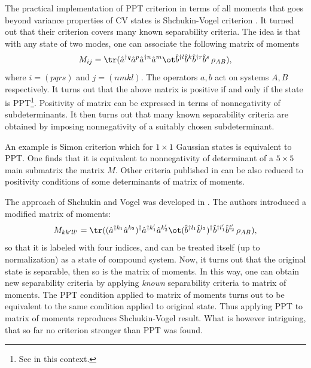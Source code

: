 \documentclass[twocolumn,aps,rmp]{revtex4}
\begin{document}
The practical implementation of PPT criterion in terms of all moments
that goes beyond variance properties of CV states is Shchukin-Vogel
criterion \cite{SV,MiranowiczP}.  It turned out that their criterion
covers many known separability criteria.  The idea is that with any
state of two modes, one can associate the following matrix of moments
\begin{equation}
M_{ij}=\tr (\hat a^{\dagger q} \hat
a^{p}\hat a^{\dagger n} \hat a^{m} \ot \hat b^{\dagger l} \hat
b^{k}\hat b^{\dagger r} \hat b^{s}\,\rho_{AB}),
\end{equation}
where $i=(pqrs)$ and $j=(nmkl)$. The operators $a,b$ act on systems
$A,B$ respectively. It turns out that the above matrix is positive if
and only if the state is PPT\footnote{See \cite{VerchWerner} in this
  context.}. Positivity of matrix can be expressed in terms of
nonnegativity of subdeterminants. It then turns out that many known
separability criteria are obtained by imposing nonnegativity of a
suitably chosen subdeterminant.

An example is Simon criterion which for $1\times 1$ Gaussian states is
equivalent to PPT. One finds that it is equivalent to nonnegativity of
determinant of a $5\times 5$ main submatrix the matrix $M$. Other
criteria published in
\cite{DuanGCZ1999-criterion,ManciniGVT2001-criterion,RaymerFSG-cont-var,AgarwalB-cont-var,HilleryZ-cont-var}
can be also reduced to positivity conditions of some determinants of
matrix of moments.

The approach of Shchukin and Vogel was developed in
\cite{MiranowiczPHH2006-moments}. The authors introduced a modified
matrix of moments:
\begin{equation}
M_{kk'll'}=\tr ( (\hat a^{\dagger k_1} \hat
a^{k_2})^\dagger \hat a^{\dagger k_1'} \hat a^{k_2'} \ot (\hat
b^{\dagger l_1} \hat b^{l_2})^\dagger \hat b^{\dagger l_1'} \hat
b^{l_2'} \,\rho_{AB}),
\end{equation}
so that it is labeled with four indices, and can be treated itself (up
to normalization) as a state of compound system. Now, it turns out
that the original state is separable, then so is the matrix of
moments. In this way, one can obtain new separability criteria by
applying {\it known} separability criteria to matrix of moments. The
PPT condition applied to matrix of moments turns out to be equivalent
to the same condition applied to original state. Thus applying PPT to
matrix of moments reproduces Shchukin-Vogel result. What is however
intriguing, that so far no criterion stronger than PPT was found.
\end{document}
